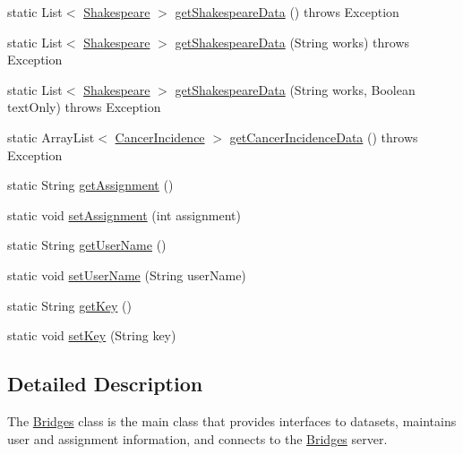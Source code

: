 \begin{DoxyCompactItemize}
\item 
static List$<$ \mbox{\hyperlink{classbridges_1_1data__src__dependent_1_1_shakespeare}{Shakespeare}} $>$ \mbox{\hyperlink{classbridges_1_1connect_1_1_bridges_adc8d19f28677afb03db53736455de2d0}{get\+Shakespeare\+Data}} ()  throws Exception 
\item 
static List$<$ \mbox{\hyperlink{classbridges_1_1data__src__dependent_1_1_shakespeare}{Shakespeare}} $>$ \mbox{\hyperlink{classbridges_1_1connect_1_1_bridges_a53ac587893826c57644f2e03b33ae455}{get\+Shakespeare\+Data}} (String works)  throws Exception 
\item 
static List$<$ \mbox{\hyperlink{classbridges_1_1data__src__dependent_1_1_shakespeare}{Shakespeare}} $>$ \mbox{\hyperlink{classbridges_1_1connect_1_1_bridges_aa81c312e631bc76fa49e0ccae66679dc}{get\+Shakespeare\+Data}} (String works, Boolean text\+Only)  throws Exception 
\item 
static Array\+List$<$ \mbox{\hyperlink{classbridges_1_1data__src__dependent_1_1_cancer_incidence}{Cancer\+Incidence}} $>$ \mbox{\hyperlink{classbridges_1_1connect_1_1_bridges_ad3d3afcf9df9e2b87d069bc050029628}{get\+Cancer\+Incidence\+Data}} ()  throws Exception 
\item 
static String \mbox{\hyperlink{classbridges_1_1connect_1_1_bridges_af049c06c532987eb616156fb16ea2f43}{get\+Assignment}} ()
\item 
static void \mbox{\hyperlink{classbridges_1_1connect_1_1_bridges_ad56c9d138965c41947bb51fe056c1cc9}{set\+Assignment}} (int assignment)
\item 
static String \mbox{\hyperlink{classbridges_1_1connect_1_1_bridges_a75f047cda3100e0cfa88378293c12961}{get\+User\+Name}} ()
\item 
static void \mbox{\hyperlink{classbridges_1_1connect_1_1_bridges_af9b9a2ca03ba02c0c2be4716594678a6}{set\+User\+Name}} (String user\+Name)
\item 
static String \mbox{\hyperlink{classbridges_1_1connect_1_1_bridges_a426897d6e5449601bb4e20c32b8346f5}{get\+Key}} ()
\item 
static void \mbox{\hyperlink{classbridges_1_1connect_1_1_bridges_ab69e89ec7d2e674a8b8c4b0be0c63397}{set\+Key}} (String key)
\end{DoxyCompactItemize}


\subsection{Detailed Description}
The \mbox{\hyperlink{classbridges_1_1connect_1_1_bridges}{Bridges}} class is the main class that provides interfaces to datasets, maintains user and assignment information, and connects to the \mbox{\hyperlink{classbridges_1_1connect_1_1_bridges}{Bridges}} server. 

